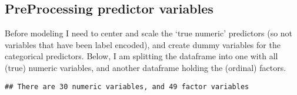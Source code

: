\documentclass[]{article}
\newenvironment{Shaded}{\begin{snugshade}}{\end{snugshade}}
\newcommand{\KeywordTok}[1]{\textcolor[rgb]{0.13,0.29,0.53}{\textbf{#1}}}
\newcommand{\StringTok}[1]{\textcolor[rgb]{0.31,0.60,0.02}{#1}}
\newcommand{\CommentTok}[1]{\textcolor[rgb]{0.56,0.35,0.01}{\textit{#1}}}
\newcommand{\OperatorTok}[1]{\textcolor[rgb]{0.81,0.36,0.00}{\textbf{#1}}}
\newcommand{\NormalTok}[1]{#1}
\begin{document}
\subsection{PreProcessing predictor
variables}\label{preprocessing-predictor-variables}

Before modeling I need to center and scale the `true numeric' predictors
(so not variables that have been label encoded), and create dummy
variables for the categorical predictors. Below, I am splitting the
dataframe into one with all (true) numeric variables, and another
dataframe holding the (ordinal) factors.

\begin{Shaded}
\end{Shaded}

\begin{verbatim}
## There are 30 numeric variables, and 49 factor variables
\end{verbatim}
\end{document}
